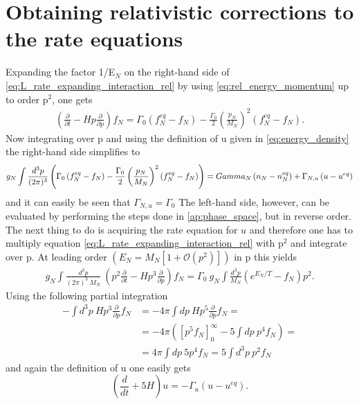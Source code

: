 \section{Obtaining relativistic corrections to the rate equations}
\label{ap:rel_corrections}
Expanding the factor 1/E$_N$ on the right-hand side of \eqref{eq:L_rate_expanding_interaction_rel} by using \eqref{eq:rel_energy_momentum} up to order p$^2$, one gets
\begin{align*}
		\left(\frac{\partial}{\partial t}-Hp\frac{\partial}{\partial p}\right)f_N=\Gamma_0\left(f_N^{eq}-f_N\right)-\frac{\Gamma_0}{2}\left(\frac{p_N}{M_N}\right)^2\left(f_N^{eq}-f_N\right).
\end{align*}
Now integrating over p and using the definition of u given in \eqref{eq:energy_density} the right-hand side simplifies to
\begin{equation*}
	g_N\int \frac{d^3p}{(2\pi)^3}\left(\Gamma_0\left(f_N^{eq}-f_N\right)-\frac{\Gamma_0}{2}\left(\frac{p_N}{M_N}\right)^2\left(f_N^{eq}-f_N\right)\right)=\-Gamma_N\left(n_N-n_N^{eq}\right)+\Gamma_{N,u}\left(u-u^{eq}\right)
\end{equation*}
and it can easily be seen that $\Gamma_{N,u}=\Gamma_{0}$ \newline\indent
The left-hand side, however, can be evaluated by performing the steps done in \ref{ap:phase_space}, but in reverse order. \newline\indent
The next thing to do is acquiring the rate equation for $u$ and therefore one has to multiply equation \eqref{eq:L_rate_expanding_interaction_rel} with p$^2$ and integrate over p. At leading order $\left(E_N=M_N\left[1+\mathcal{O}(p^2)\right]\right)$ in p this yields
\begin{align*}
	g_N\int \frac{d^3p}{(2\pi)^3\:M_N}\:\left(p^2\frac{\partial}{\partial t}-Hp^3\frac{\partial}{\partial p}\right)f_N=\Gamma_0\:g_N\int \frac{d^3p}{M_N}\left(e^{E_N/T}-f_N\right)p^2.
\end{align*}
Using the following partial integration
\begin{align*}
	-\int d^3p\:Hp^3\frac{\partial}{\partial p}f_N&=-4\pi\int dp\:Hp^5\frac{\partial}{\partial p}f_N=\\
	&=-4\pi\left(\left[p^5f_N\right]_0^\infty-5\int dp\: p^4f_N\right)=\\
	&=4\pi\int dp\: 5p^4f_N=5\int d^3p\: p^2f_N
\end{align*}
and again the definition of u one easily gets
\begin{equation*}
	\left(\frac{d}{dt}+5H\right)u=-\Gamma_u\left(u-u^{eq}\right).
\end{equation*}
